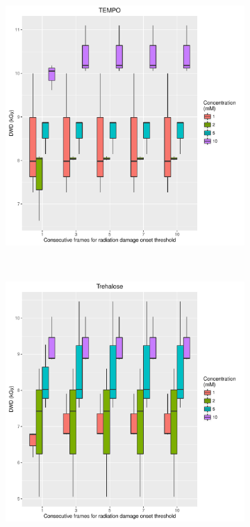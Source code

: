 \begin{figure}
    \ContinuedFloat
    \begin{subfigure}[b]{0.75\textwidth}
            \centering
            \includegraphics[width=\textwidth]{figures/saxs/TEMPO_Num_consec_fr_comp.pdf}
            \caption{}
            \label{}
    \end{subfigure}
    \\
    \begin{subfigure}[b]{0.75\textwidth}
            \centering
            \includegraphics[width=\textwidth]{figures/saxs/Trehalose_Num_consec_fr_comp.pdf}

\end{subfigure}
\end{figure}
